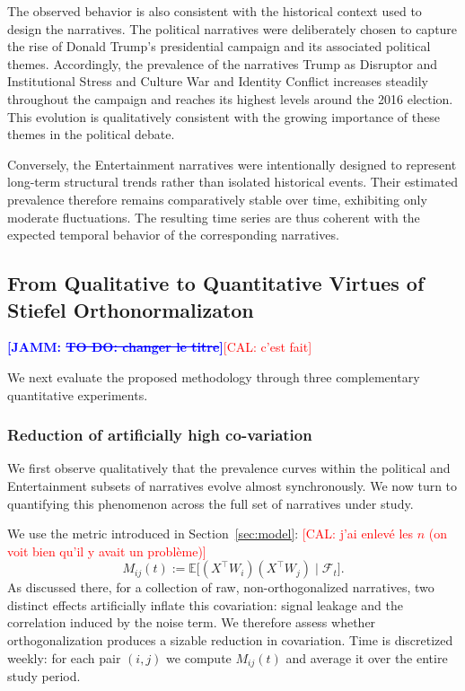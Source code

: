 \documentclass[
  journal=medium,
  manuscript=article-type,
  year=2025,
  volume=1,
]{cup-journal}
\def\narr#1{{\sc #1}}
\newcommand{\JAMM}[1]{\textcolor{blue}{\textbf{[JAMM: #1]}}}
\begin{document}
The observed behavior is also consistent with the historical context used to design the narratives. The political narratives were deliberately chosen to capture the rise of Donald Trump's presidential campaign and its associated political themes. Accordingly, the prevalence of the narratives \narr{Trump as Disruptor and Institutional Stress} and \narr{Culture War and Identity Conflict} increases steadily throughout the campaign and reaches its highest levels around the 2016 election. This evolution is qualitatively consistent with the growing importance of these themes in the political debate.

Conversely, the Entertainment narratives were intentionally designed to represent long-term structural trends rather than isolated historical events. Their estimated prevalence therefore remains comparatively stable over time, exhibiting only moderate fluctuations. The resulting time series are thus coherent with the expected temporal behavior of the corresponding narratives.



\subsection{From Qualitative to Quantitative Virtues of Stiefel Orthonormalizaton}
\JAMM{\st{TO DO: changer le titre}}\textcolor{red}{[CAL: c'est fait]}
\label{sec:application:quantitative}

We next evaluate the proposed methodology through three complementary quantitative experiments.

\subsubsection{Reduction of artificially high co-variation}
We first observe qualitatively that the prevalence curves within the political and Entertainment subsets of narratives evolve almost synchronously. We now turn to quantifying this phenomenon across the full set of narratives under study.

We use the metric introduced in Section~\ref{sec:model}:
\textcolor{red}{[CAL: j'ai enlevé les $n$ (on voit bien qu'il y avait un problème)]}
\[
M_{ij}(t) := \mathbb{E}\bigl[(X^\top W_i)(X^\top W_j)\mid\mathcal{F}_t\bigr].
\]
As discussed there, for a collection of raw, non-orthogonalized narratives, two distinct effects artificially inflate this covariation: signal leakage and the correlation induced by the noise term. We therefore assess whether orthogonalization produces a sizable reduction in covariation. Time is discretized weekly: for each pair $(i,j)$ we compute $M_{ij}(t)$ and average it over the entire study period.
\end{document}
